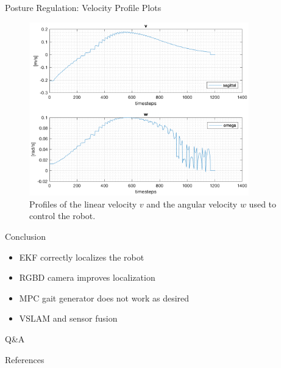 \documentclass[10pt]{beamer}
\begin{document}
    \begin{frame}{Posture Regulation: Velocity Profile Plots}
        \begin{figure}
            \caption{Profiles of the linear velocity $v$ and the angular
                velocity $w$ used to control the robot.}
            \vspace{-0.3cm}
            \includegraphics[width=0.85\textwidth]{images/unicycle_velocities.png}
        \end{figure}
    \end{frame}

    \begin{frame}{Conclusion}
        \begin{itemize}
            \item EKF correctly localizes the robot
            \item RGBD camera improves localization
            \item MPC gait generator does not work as desired
            \item VSLAM and sensor fusion
        \end{itemize}
    \end{frame}

    \begin{frame}[standout]
        Q\&A
    \end{frame}

    \appendix

    \begin{frame}{References}
        
        
    \end{frame}
\end{document}
